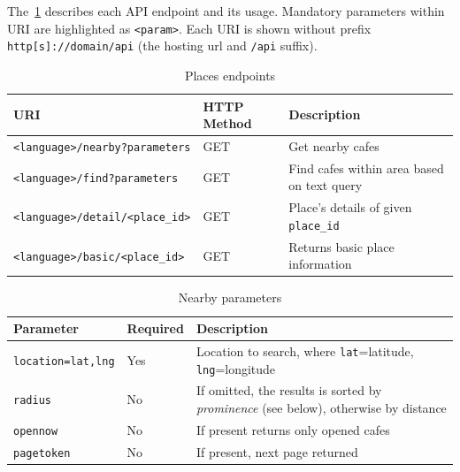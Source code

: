 The~\cref{table:cta-places} describes each API endpoint and its usage. Mandatory parameters within URI are highlighted as \verb|<param>|. Each URI is shown without prefix \verb|http[s]://domain/api| (the hosting url and \verb|/api| suffix).
\begin{table}[ht]
\centering
\begin{tabularx}{\textwidth}{|l|l|X|}
\hline
\textbf{URI} & \textbf{HTTP Method} & \textbf{Description} \\ \hline
\verb|<language>/nearby?parameters| & GET & Get nearby cafes \\ \hline
\verb|<language>/find?parameters| & GET & Find cafes within area based on text query \\ \hline
\verb|<language>/detail/<place_id>| & GET & Place's details of given \verb|place_id| \\ \hline
\verb|<language>/basic/<place_id>| & GET & Returns basic place information \\ \hline
\end{tabularx}
\caption{Places endpoints}
\label{table:cta-places}
\end{table}
\begin{table}[ht]
\centering
\begin{tabularx}{\textwidth}{|l|l|X|}
\hline
\textbf{Parameter} & \textbf{Required} & \textbf{Description} \\ \hline
\verb|location=lat,lng| & Yes & Location to search, where \verb|lat|=latitude, \verb|lng|=longitude \\ \hline
\verb|radius| & No & If omitted, the results is sorted by \textit{prominence} (see below), otherwise by distance\\ \hline
\verb|opennow| & No & If present returns only opened cafes\\ \hline
\verb|pagetoken| & No & If present, next page returned\\ \hline
\end{tabularx}
\caption{Nearby parameters}
\label{table:cta-nearby-params}
\end{table}

